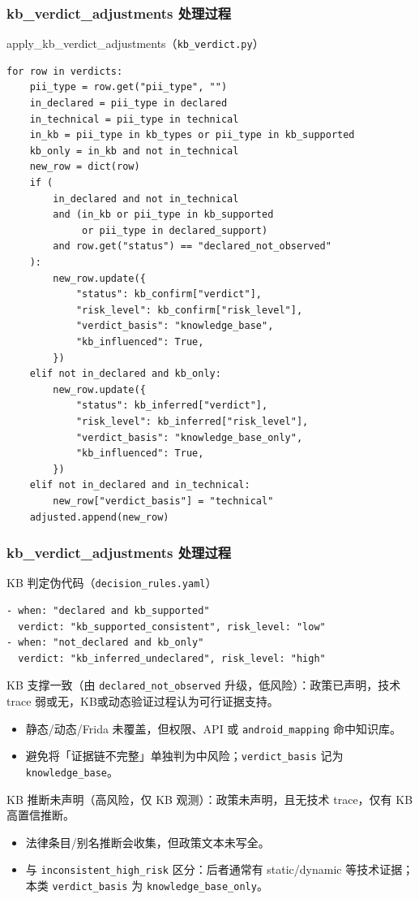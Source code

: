 \documentclass[AutoFakeBold,AutoFakeSlant]{beamer}
\begin{document}
\begin{frame}[fragile]
    \frametitle{kb\_verdict\_adjustments 处理过程}
    \begin{block}{apply\_kb\_verdict\_adjustments（\texttt{kb\_verdict.py}）}
    \tiny
    \begin{verbatim}
for row in verdicts:
    pii_type = row.get("pii_type", "")
    in_declared = pii_type in declared
    in_technical = pii_type in technical
    in_kb = pii_type in kb_types or pii_type in kb_supported
    kb_only = in_kb and not in_technical
    new_row = dict(row)
    if (
        in_declared and not in_technical
        and (in_kb or pii_type in kb_supported
             or pii_type in declared_support)
        and row.get("status") == "declared_not_observed"
    ):
        new_row.update({
            "status": kb_confirm["verdict"],
            "risk_level": kb_confirm["risk_level"],
            "verdict_basis": "knowledge_base",
            "kb_influenced": True,
        })
    elif not in_declared and kb_only:
        new_row.update({
            "status": kb_inferred["verdict"],
            "risk_level": kb_inferred["risk_level"],
            "verdict_basis": "knowledge_base_only",
            "kb_influenced": True,
        })
    elif not in_declared and in_technical:
        new_row["verdict_basis"] = "technical"
    adjusted.append(new_row)
    \end{verbatim}
    \end{block}
\end{frame}

\begin{frame}[fragile]
    \frametitle{kb\_verdict\_adjustments 处理过程}
    \begin{block}{KB 判定伪代码（\texttt{decision\_rules.yaml}）}
    \scriptsize
    \begin{verbatim}
- when: "declared and kb_supported"
  verdict: "kb_supported_consistent", risk_level: "low"
- when: "not_declared and kb_only"
  verdict: "kb_inferred_undeclared", risk_level: "high"
    \end{verbatim}
    \end{block}
    KB 支撑一致（由 \texttt{declared\_not\_observed} 升级，低风险）：政策已声明，技术 trace 弱或无，KB或动态验证过程认为可行证据支持。\\
    \begin{itemize}
        \item 静态/动态/Frida 未覆盖，但权限、API 或 \texttt{android\_mapping} 命中知识库。
        \item 避免将「证据链不完整」单独判为中风险；\texttt{verdict\_basis} 记为 \texttt{knowledge\_base}。
    \end{itemize}
    KB 推断未声明（高风险，仅 KB 观测）：政策未声明，且无技术 trace，仅有 KB 高置信推断。\\
    \begin{itemize}
        \item 法律条目/别名推断会收集，但政策文本未写全。
        \item 与 \texttt{inconsistent\_high\_risk} 区分：后者通常有 static/dynamic 等技术证据；本类 \texttt{verdict\_basis} 为 \texttt{knowledge\_base\_only}。
    \end{itemize}
\end{frame}
\end{document}
